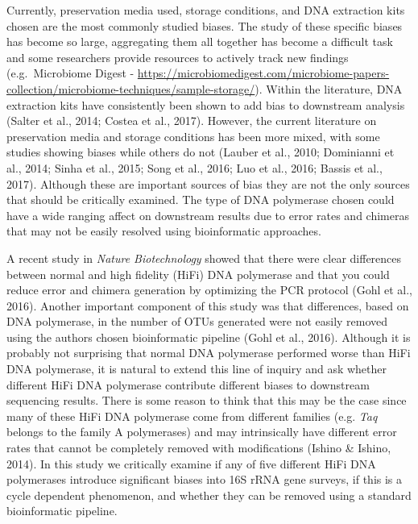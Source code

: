 \documentclass[12pt,]{article}
\begin{document}
Currently, preservation media used, storage conditions, and DNA
extraction kits chosen are the most commonly studied biases. The study
of these specific biases has become so large, aggregating them all
together has become a difficult task and some researchers provide
resources to actively track new findings (e.g.~Microbiome Digest -
\url{https://microbiomedigest.com/microbiome-papers-collection/microbiome-techniques/sample-storage/}).
Within the literature, DNA extraction kits have consistently been shown
to add bias to downstream analysis (Salter et al., 2014; Costea et al.,
2017). However, the current literature on preservation media and storage
conditions has been more mixed, with some studies showing biases while
others do not (Lauber et al., 2010; Dominianni et al., 2014; Sinha et
al., 2015; Song et al., 2016; Luo et al., 2016; Bassis et al., 2017).
Although these are important sources of bias they are not the only
sources that should be critically examined. The type of DNA polymerase
chosen could have a wide ranging affect on downstream results due to
error rates and chimeras that may not be easily resolved using
bioinformatic approaches.

A recent study in \emph{Nature Biotechnology} showed that there were
clear differences between normal and high fidelity (HiFi) DNA polymerase
and that you could reduce error and chimera generation by optimizing the
PCR protocol (Gohl et al., 2016). Another important component of this
study was that differences, based on DNA polymerase, in the number of
OTUs generated were not easily removed using the authors chosen
bioinformatic pipeline (Gohl et al., 2016). Although it is probably not
surprising that normal DNA polymerase performed worse than HiFi DNA
polymerase, it is natural to extend this line of inquiry and ask whether
different HiFi DNA polymerase contribute different biases to downstream
sequencing results. There is some reason to think that this may be the
case since many of these HiFi DNA polymerase come from different
families (e.g. \emph{Taq} belongs to the family A polymerases) and may
intrinsically have different error rates that cannot be completely
removed with modifications (Ishino \& Ishino, 2014). In this study we
critically examine if any of five different HiFi DNA polymerases
introduce significant biases into 16S rRNA gene surveys, if this is a
cycle dependent phenomenon, and whether they can be removed using a
standard bioinformatic pipeline.
\end{document}
